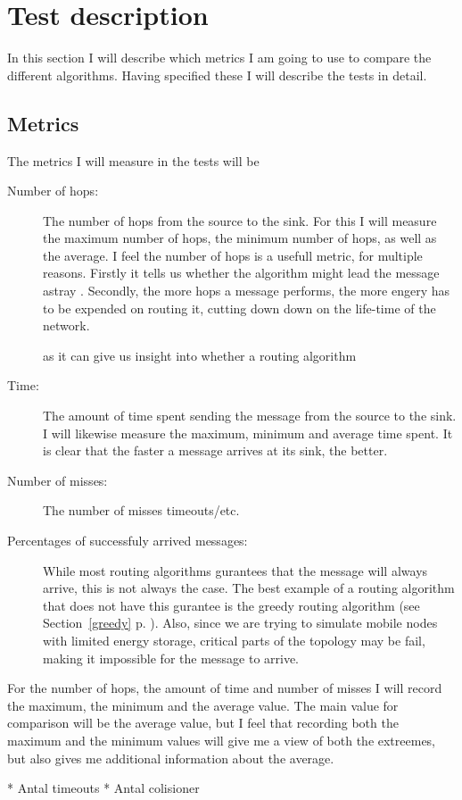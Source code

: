 \section{Test description}
In this section I will describe which metrics I am going to use to compare the different algorithms. Having specified these I will describe the tests in detail.

\subsection{Metrics}

The metrics I will measure in the tests will be 
\begin{description}
\item[Number of hops:] The number of hops from the source to the sink. For this I will measure the maximum number of hops, the minimum number of hops, as well as the average. I feel the number of hops is a usefull metric, for multiple reasons. Firstly it tells us whether the algorithm might lead the message astray  . Secondly, the more hops a message performs, the more engery has to be expended on routing it, cutting down down on the life-time of the network.

as it can give us insight into whether a routing algorithm 
\item[Time:] The amount of time spent sending the message from the source to the sink. I will likewise measure the maximum, minimum and average time spent. It is clear that the faster a message arrives at its sink, the better.

\item[Number of misses:] The number of misses timeouts/etc. 

\item[Percentages of successfuly arrived messages:] While most routing algorithms gurantees that the message will always arrive, this is not always the case. The best example of a routing algorithm that does not have this gurantee is the greedy routing algorithm (see Section~\ref{greedy} p. \pageref{greedy}). Also, since we are trying to simulate mobile nodes with limited energy storage, critical parts of the topology may be fail, making it impossible for the message to arrive.

\end{description}

For the number of hops, the amount of time and number of misses I will record the maximum, the minimum and the average value. The main value for comparison will be the average value, but I feel that recording both the maximum and the minimum values will give me a view of both the extreemes, but also gives me additional information about the average.

* Antal timeouts
* Antal colisioner
